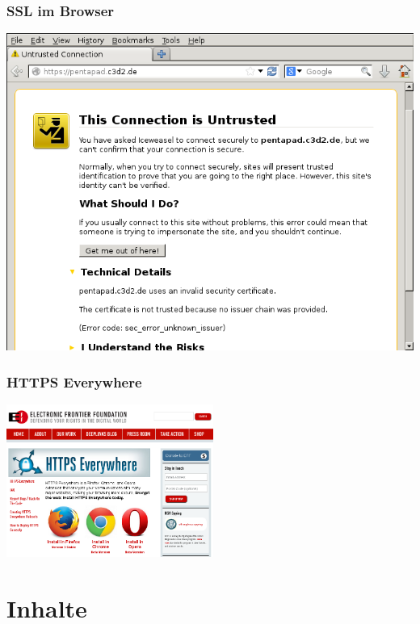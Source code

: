 \documentclass[12pt]{beamer}
\begin{document}
\begin{frame}
    \frametitle{SSL im Browser}
    \begin{center}
	\includegraphics[height=0.7\textheight]{img/ssl_unverified.png}
    \end{center}
\end{frame}

\begin{frame}
  \frametitle{HTTPS Everywhere}
    \begin{center}
      \includegraphics[height=5cm]{img/https-everywhere.png}
    \end{center}
\end{frame}

\section{Inhalte}
\subsection{}
\end{document}
